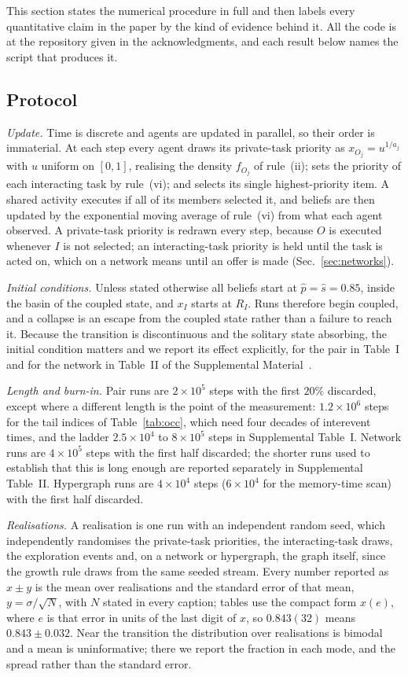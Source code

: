 \documentclass[aps,pre,twocolumn,superscriptaddress,floatfix,longbibliography]{revtex4-2}
\begin{document}
This section states the numerical procedure in full and then labels every
quantitative claim in the paper by the kind of evidence behind it. All the code
is at the repository given in the acknowledgments, and each result below names
the script that produces it.

\subsection[Protocol]{Protocol}

\emph{Update.} Time is discrete and agents are updated in parallel, so
their order is immaterial. At each step every agent draws its private-task
priority as $x_{O_j}=u^{1/a_j}$ with $u$ uniform on $[0,1]$, realising the
density $f_{O_j}$ of rule~(ii); sets the priority of each interacting task by
rule~(vi); and selects its single highest-priority item. A shared activity
executes if all of its members selected it, and beliefs are then updated by the
exponential moving average of rule~(vi) from what each agent observed. A
private-task priority is redrawn every step, because $O$ is executed whenever
$I$ is not selected; an interacting-task priority is held until the task is
acted on, which on a network means until an offer is made
(Sec.~\ref{sec:networks}).

\emph{Initial conditions.} Unless stated otherwise all beliefs start at
$\hat p=\hat s=0.85$, inside the basin of the coupled state, and $x_I$ starts at
$R_I$. Runs therefore begin coupled, and a collapse is an escape from the
coupled state rather than a failure to reach it. Because the transition is
discontinuous and the solitary state absorbing, the initial condition matters
and we report its effect explicitly, for the pair in
Table~I and for the network in Table~II of the Supplemental
Material~\cite{SM}.

\emph{Length and burn-in.} Pair runs are $2\times10^5$ steps with the
first $20\%$ discarded, except where a different length is the point of the
measurement: $1.2\times10^6$ steps for the tail indices of
Table~\ref{tab:occ}, which need four decades of interevent times, and the
ladder $2.5\times10^4$ to $8\times10^5$ steps in Supplemental Table~I.
Network runs are $4\times10^5$ steps with the first half discarded; the shorter
runs used to establish that this is long enough are reported separately in
Supplemental Table~II. Hypergraph runs are $4\times10^4$ steps
($6\times10^4$ for the memory-time scan) with the first half discarded.

\emph{Realisations.} A realisation is one run with an independent random
seed, which independently randomises the private-task priorities, the
interacting-task draws, the exploration events and, on a network or hypergraph,
the graph itself, since the growth rule draws from the same seeded stream. Every
number reported as $x\pm y$ is the mean over realisations and the standard error
of that mean, $y=\sigma/\sqrt{N}$, with $N$ stated in every caption; tables use
the compact form $x(e)$, where $e$ is that error in units of the last digit of
$x$, so $0.843(32)$ means $0.843\pm0.032$. Near the transition the distribution
over realisations is bimodal and a mean is uninformative; there we report the
fraction in each mode, and the spread rather than the standard error.
\end{document}
